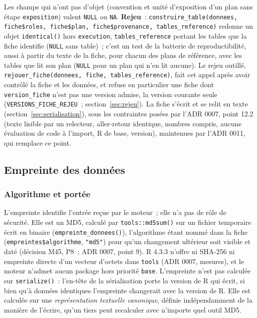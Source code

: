 \documentclass[a4paper,11pt]{article}
\newcommand{\code}[1]{\texttt{\small #1}}
\begin{document}
\noindent
Les champs qui n'ont pas d'objet (convention et unité d'exposition d'un plan
sans étape \code{exposition}) valent \code{NULL} ou \code{NA}. \textbf{Rejeu}~:
\code{construire\_table(donnees, fiche\$roles, fiche\$plan, fiche\$provenance, tables\_reference)}
redonne un objet \code{identical()} hors \code{execution}, \code{tables\_reference}
portant les tables que la fiche identifie (\code{NULL} sans table)~; c'est un test de
la batterie de reproductibilité, aussi à partir du texte de la fiche, pour
chacun des plans de référence, avec les tables que lit son plan (\code{NULL} pour un plan qui n'en lit aucune). Le
rejeu outillé, \code{rejouer\_fiche(donnees, fiche, tables\_reference)}, fait cet appel après
avoir contrôlé la fiche et les données, et refuse en particulier une fiche
dont \code{version\_fiche} n'est pas une version admise, la version
courante seule (\code{VERSIONS\_FICHE\_REJEU}~; section~\ref{sec:rejeu}). La
fiche s'écrit et se relit en texte (section~\ref{sec:serialisation}), sous
les contraintes posées par l'ADR 0007, point 12.2 (texte lisible par un
relecteur, aller-retour identique, nombres compris, aucune évaluation de
code à l'import, R de base, version), maintenues par l'ADR 0011, qui remplace
ce point.

\subsection{Empreinte des données}
\label{sec:empreinte}

\subsubsection*{Algorithme et portée}

L'empreinte identifie l'entrée reçue par le moteur~; elle n'a pas de rôle de
sécurité. Elle est un MD5, calculé par \code{tools::md5sum()} sur un fichier
temporaire écrit en binaire (\code{empreinte\_donnees()}), l'algorithme étant
nommé dans la fiche (\code{empreintes\$algorithme}, \code{"md5"}) pour qu'un
changement ultérieur soit visible et daté (décision M45, P8~; ADR 0007,
point 9). R 4.3.3 n'offre ni SHA-256 ni empreinte directe d'un vecteur
d'octets dans \code{tools} (ADR 0007, mesures), et le moteur n'admet aucun
package hors priorité \code{base}. L'empreinte n'est pas calculée sur
\code{serialize()}~: l'en-tête de la sérialisation porte la version de R qui
écrit, si bien qu'à données identiques l'empreinte changerait avec la version
de R. Elle est calculée sur une \emph{représentation textuelle canonique},
définie indépendamment de la manière de l'écrire, qu'un tiers peut recalculer
avec n'importe quel outil MD5.
\end{document}
